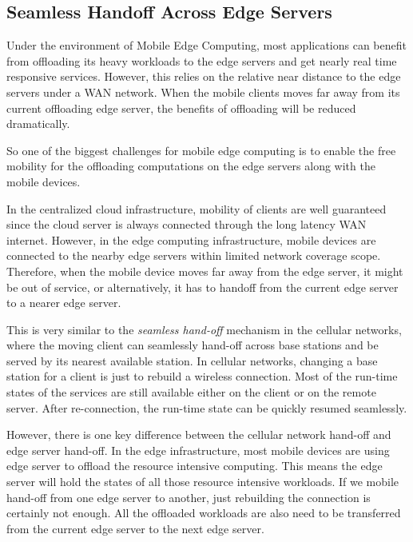 \subsection{Seamless Handoff Across 
Edge Servers}

Under the environment of Mobile Edge Computing, most applications can benefit from offloading its heavy workloads to the edge servers and get nearly real time responsive services. However, this relies on the relative near distance to the edge servers under a WAN network. When the mobile clients moves far away from its current offloading edge server, the benefits of offloading will be reduced dramatically.

So one of the biggest challenges for mobile edge computing is to enable the free mobility for the offloading computations on the edge servers along with the mobile devices. 

In the centralized cloud infrastructure, mobility of clients are well guaranteed since the cloud server is always connected through the long latency WAN internet. However, in the edge computing infrastructure, mobile devices are connected to the nearby edge servers within limited network coverage scope. Therefore, when the mobile device moves far away from the edge server, it might be out of service, or alternatively, it has to handoff from the current edge server to a nearer edge server. 

This is very similar to the \textit{seamless hand-off } mechanism in the cellular networks, where the moving client can seamlessly hand-off across base stations and be served by its nearest available station. In cellular networks, changing a base station for a client is just to rebuild a wireless connection. Most of the run-time states of the services are still available either on the client or on the remote server. After re-connection, the run-time state can be quickly resumed seamlessly. 

However, there is one key difference between the cellular network hand-off and edge server hand-off. In the edge infrastructure, most mobile devices are using edge server to offload the resource intensive computing. This means the edge server will hold the states of all those resource intensive workloads. If we mobile hand-off from one edge server to another, just rebuilding the connection is certainly not enough. All the offloaded workloads are also need to be transferred from the current edge server to the next edge server.  

